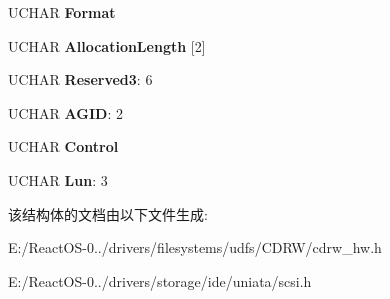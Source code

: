 \begin{DoxyCompactItemize}
U\+C\+H\+AR {\bfseries Format}
\item 
\mbox{\label{struct___c_d_b_1_1___r_e_a_d___d_v_d___s_t_r_u_c_t_u_r_e_a530428fd0ef77fdb65a3f39b3569f876}} 
U\+C\+H\+AR {\bfseries Allocation\+Length} \mbox{[}2\mbox{]}
\item 
\mbox{\label{struct___c_d_b_1_1___r_e_a_d___d_v_d___s_t_r_u_c_t_u_r_e_a7d8905c58f3deeaea643d1d1251f19dc}} 
U\+C\+H\+AR {\bfseries Reserved3}\+: 6
\item 
\mbox{\label{struct___c_d_b_1_1___r_e_a_d___d_v_d___s_t_r_u_c_t_u_r_e_a4aa4e3a89dcaa0f2674934cdd0a2af9d}} 
U\+C\+H\+AR {\bfseries A\+G\+ID}\+: 2
\item 
\mbox{\label{struct___c_d_b_1_1___r_e_a_d___d_v_d___s_t_r_u_c_t_u_r_e_aa66d3e0db7391095dbb1661975b19ae9}} 
U\+C\+H\+AR {\bfseries Control}
\item 
\mbox{\label{struct___c_d_b_1_1___r_e_a_d___d_v_d___s_t_r_u_c_t_u_r_e_afda01b6f579abbb8534bd4e360070228}} 
U\+C\+H\+AR {\bfseries Lun}\+: 3
\end{DoxyCompactItemize}


该结构体的文档由以下文件生成\+:\begin{DoxyCompactItemize}
\item 
E\+:/\+React\+O\+S-\/0../drivers/filesystems/udfs/\+C\+D\+R\+W/cdrw\+\_\+hw.\+h\item 
E\+:/\+React\+O\+S-\/0../drivers/storage/ide/uniata/scsi.\+h\end{DoxyCompactItemize}
